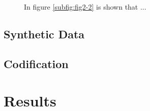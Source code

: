 \documentclass[twocolumn, draft]{emulateapj}
\begin{document}
\begin{figure}[ht]
	\centering
	\caption{In figure \ref{subfig:fig2-2} is shown that ...}
	\label{fig:subfigs}
\end{figure}

\subsection{Synthetic Data}

\subsection{Codification}

\section{Results}
\label{sec:results}
\end{document}
